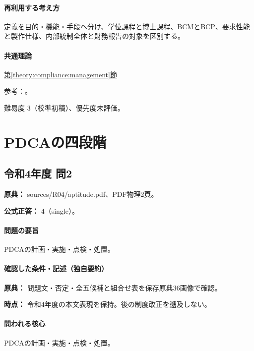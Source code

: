 \paragraph{再利用する考え方} 定義を目的・機能・手段へ分け、学位課程と博士課程、BCMとBCP、要求性能と製作仕様、内部統制全体と財務報告の対象を区別する。

\paragraph{共通理論} \hyperref[theory:compliance:management]{第\ref*{theory:compliance:management}節}

\par 参考：\cite{eng52_professional,eng52_bcp,eng52_performance,eng52_ve,eng52_control}。

\par 難易度 3（校準初稿）、優先度未評価。

\section{PDCAの四段階}

\subsection{令和4年度 問2}
\label{q:r04-reg-apt-02}

\noindent\textbf{原典：} sources/R04/aptitude.pdf、PDF物理2頁。

\textbf{公式正答：} 4（single）。

\paragraph{問題の要旨} PDCAの計画・実施・点検・処置。

\paragraph{確認した条件・記述（独自要約）}\mbox{}\par

\noindent\textbf{原典：} 問題文・否定・全五候補と組合せ表を保存原典36画像で確認。\par

\noindent\textbf{時点：} 令和4年度の本文表現を保持。後の制度改正を遡及しない。\par

\paragraph{問われる核心} PDCAの計画・実施・点検・処置。

